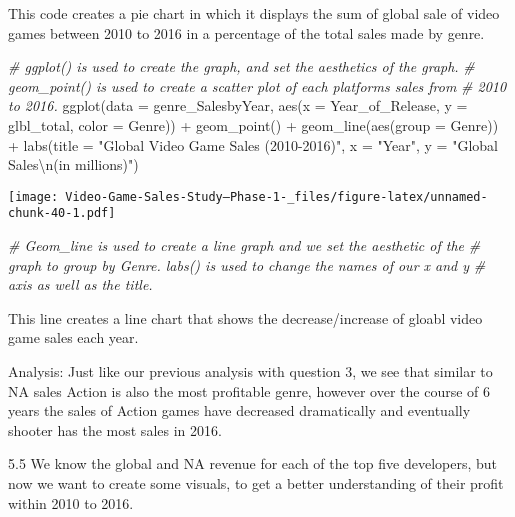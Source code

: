 \documentclass[
]{article}
\newenvironment{Shaded}{\begin{snugshade}}{\end{snugshade}}
\newcommand{\AttributeTok}[1]{\textcolor[rgb]{0.77,0.63,0.00}{#1}}
\newcommand{\CommentTok}[1]{\textcolor[rgb]{0.56,0.35,0.01}{\textit{#1}}}
\newcommand{\FunctionTok}[1]{\textcolor[rgb]{0.00,0.00,0.00}{#1}}
\newcommand{\NormalTok}[1]{#1}
\newcommand{\SpecialCharTok}[1]{\textcolor[rgb]{0.00,0.00,0.00}{#1}}
\newcommand{\StringTok}[1]{\textcolor[rgb]{0.31,0.60,0.02}{#1}}
\begin{document}
This code creates a pie chart in which it displays the sum of global
sale of video games between 2010 to 2016 in a percentage of the total
sales made by genre.

\begin{Shaded}
\begin{Highlighting}[]
\CommentTok{\# ggplot() is used to create the graph, and set the aesthetics of the graph.}
\CommentTok{\# geom\_point() is used to create a scatter plot of each platforms sales from}
\CommentTok{\# 2010 to 2016.}
\FunctionTok{ggplot}\NormalTok{(}\AttributeTok{data =}\NormalTok{ genre\_SalesbyYear, }\FunctionTok{aes}\NormalTok{(}\AttributeTok{x =}\NormalTok{ Year\_of\_Release, }\AttributeTok{y =}\NormalTok{ glbl\_total, }\AttributeTok{color =}\NormalTok{ Genre)) }\SpecialCharTok{+}
    \FunctionTok{geom\_point}\NormalTok{() }\SpecialCharTok{+} \FunctionTok{geom\_line}\NormalTok{(}\FunctionTok{aes}\NormalTok{(}\AttributeTok{group =}\NormalTok{ Genre)) }\SpecialCharTok{+} \FunctionTok{labs}\NormalTok{(}\AttributeTok{title =} \StringTok{"Global Video Game Sales (2010{-}2016)"}\NormalTok{,}
    \AttributeTok{x =} \StringTok{"Year"}\NormalTok{, }\AttributeTok{y =} \StringTok{"Global Sales}\SpecialCharTok{\textbackslash{}n}\StringTok{(in millions)"}\NormalTok{)}
\end{Highlighting}
\end{Shaded}

\texttt{[image: Video-Game-Sales-Study--Phase-1-\_files/figure-latex/unnamed-chunk-40-1.pdf]}

\begin{Shaded}
\begin{Highlighting}[]
\CommentTok{\# Geom\_line is used to create a line graph and we set the aesthetic of the}
\CommentTok{\# graph to group by Genre. labs() is used to change the names of our x and y}
\CommentTok{\# axis as well as the title.}
\end{Highlighting}
\end{Shaded}

This line creates a line chart that shows the decrease/increase of
gloabl video game sales each year.

Analysis: Just like our previous analysis with question 3, we see that
similar to NA sales Action is also the most profitable genre, however
over the course of 6 years the sales of Action games have decreased
dramatically and eventually shooter has the most sales in 2016.

5.5 We know the global and NA revenue for each of the top five
developers, but now we want to create some visuals, to get a better
understanding of their profit within 2010 to 2016.
\end{document}
